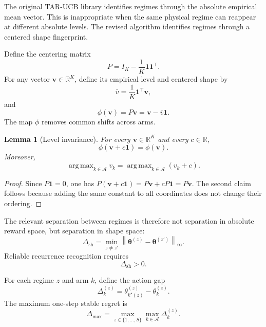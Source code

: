 \documentclass[11pt]{article}
\newtheorem{lemma}{Lemma}
\newcommand{\A}{\mathcal A}
\newcommand{\R}{\mathbb R}
\newcommand{\one}{\bm 1}
\newcommand{\norm}[1]{\left\lVert #1 \right\rVert}
\DeclareMathOperator*{\argmax}{arg\,max}
\begin{document}
The original TAR-UCB library identifies regimes through the absolute empirical mean vector. This is inappropriate when the same physical regime can reappear at different absolute levels. The revised algorithm identifies regimes through a centered shape fingerprint.

Define the centering matrix
\begin{equation}
\label{eq:centering_matrix}
P
=
I_K-\frac{1}{K}\one\one^\top .
\end{equation}
For any vector $\bm v\in\R^K$, define its empirical level and centered shape by
\begin{equation}
\label{eq:level_definition}
\bar v
=
\frac{1}{K}\one^\top \bm v,
\end{equation}
and
\begin{equation}
\label{eq:shape_map}
\phi(\bm v)
=
P\bm v
=
\bm v-\bar v\one .
\end{equation}
The map $\phi$ removes common shifts across arms.

\begin{lemma}[Level invariance]
\label{lem:level_invariance}
For every $\bm v\in\R^K$ and every $c\in\R$,
\begin{equation}
\label{eq:level_invariance}
\phi(\bm v+c\one)=\phi(\bm v).
\end{equation}
Moreover,
\begin{equation}
\label{eq:argmax_invariance}
\argmax_{k\in\A} v_k
=
\argmax_{k\in\A} (v_k+c).
\end{equation}
\end{lemma}

\begin{proof}
Since $P\one=0$, one has $P(\bm v+c\one)=P\bm v+cP\one=P\bm v$. The second claim follows because adding the same constant to all coordinates does not change their ordering.
\end{proof}

The relevant separation between regimes is therefore not separation in absolute reward space, but separation in shape space:
\begin{equation}
\label{eq:shape_separation}
\Delta_{\mathrm{sh}}
=
\min_{z\neq z'}
\norm{\bm\theta^{(z)}-\bm\theta^{(z')}}_{\infty}.
\end{equation}
Reliable recurrence recognition requires
\begin{equation}
\label{eq:positive_shape_sep}
\Delta_{\mathrm{sh}}>0.
\end{equation}

For each regime $z$ and arm $k$, define the action gap
\begin{equation}
\label{eq:arm_gap}
\Delta_k^{(z)}
=
\theta_{k^\star(z)}^{(z)}-\theta_k^{(z)}.
\end{equation}
The maximum one-step stable regret is
\begin{equation}
\label{eq:max_gap}
\Delta_{\max}
=
\max_{z\in\{1,\ldots,S\}}
\max_{k\in\A}
\Delta_k^{(z)}.
\end{equation}
\end{document}
